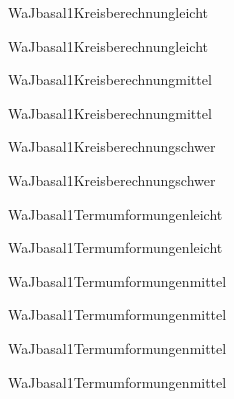 \documentclass[12pt]{article}
\begin{document}
\begin{Add}{WaJ}{basal1}{Kreisberechnung}{leicht}
\solution{ }
\end{Add}
\begin{Add}{WaJ}{basal1}{Kreisberechnung}{leicht}
\end{Add}

\begin{Add}{WaJ}{basal1}{Kreisberechnung}{mittel}
\solution{ }
\end{Add}
\begin{Add}{WaJ}{basal1}{Kreisberechnung}{mittel}
\end{Add}

\begin{Add}{WaJ}{basal1}{Kreisberechnung}{schwer}
\solution{ }
\end{Add}
\begin{Add}{WaJ}{basal1}{Kreisberechnung}{schwer}
\end{Add}

\begin{Add}{WaJ}{basal1}{Termumformungen}{leicht}
\solution{ }
\end{Add}
\begin{Add}{WaJ}{basal1}{Termumformungen}{leicht}
\end{Add}

\begin{Add}{WaJ}{basal1}{Termumformungen}{mittel}
\solution{ }
\end{Add}
\begin{Add}{WaJ}{basal1}{Termumformungen}{mittel}
\end{Add}

\begin{Add}{WaJ}{basal1}{Termumformungen}{mittel}
\solution{ }
\end{Add}
\begin{Add}{WaJ}{basal1}{Termumformungen}{mittel}
\end{Add}
\end{document}
